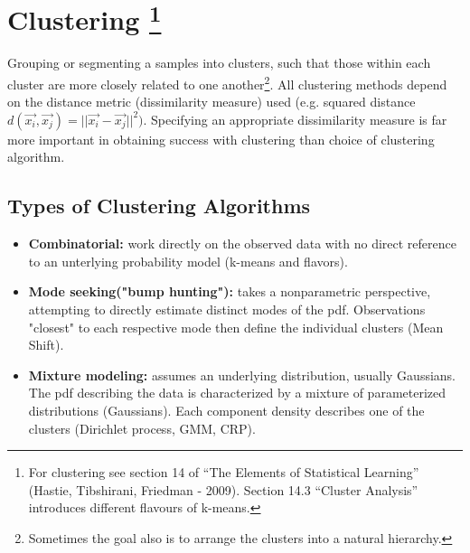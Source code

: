 
\section*{Clustering \footnote{For clustering see section 14 of ``The Elements of Statistical Learning'' (Hastie, Tibshirani, Friedman - 2009). Section 14.3 ``Cluster Analysis'' introduces different flavours of k-means. }}
Grouping or segmenting a samples into clusters, such that those within each cluster are more closely related to one another\footnote{Sometimes the goal also is to arrange the clusters into a natural hierarchy.}. All clustering methods depend on the distance metric (dissimilarity measure) used (e.g. squared distance \(d(\vec{x_i}, \vec{x_j}) = ||\vec{x_i} - \vec{x_j}||^2)\). Specifying an appropriate dissimilarity measure is far more important in obtaining success with clustering than choice of clustering algorithm.

\subsection*{Types of Clustering Algorithms}
\begin{itemize}
    \item \textbf{Combinatorial:} work directly on the observed data with no direct reference to an unterlying probability model (k-means and flavors).
    \item \textbf{Mode seeking("bump hunting"):} takes a nonparametric perspective, attempting to directly estimate distinct modes of the pdf. Observations "closest" to each respective mode then define the individual clusters (Mean Shift).
    \item \textbf{Mixture modeling:} assumes an underlying distribution, usually Gaussians. The pdf describing the data is characterized by a mixture of parameterized distributions (Gaussians). Each component density describes one of the clusters (Dirichlet process, GMM, CRP).
\end{itemize}

